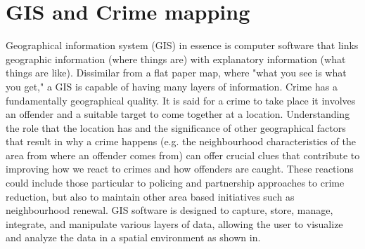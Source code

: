 \section{GIS and Crime mapping}
Geographical information system (GIS) in essence is computer software that links geographic information (where things are) with explanatory information (what things are like). Dissimilar from a flat paper map, where "what you see is what you get," a GIS is capable of having many layers of information.
Crime has a fundamentally geographical quality. It is said for a crime to take place it involves an offender and a suitable target to come together at a location. Understanding the role that the location has and the significance of other geographical factors that result in why a crime happens (e.g. the neighbourhood characteristics of the area from where an offender comes from) can offer crucial clues that contribute to improving how we react to crimes and how offenders are caught. These reactions could include those particular to policing and partnership approaches to crime reduction, but also to maintain other area based initiatives such as neighbourhood renewal.
GIS software is designed to capture, store, manage, integrate, and manipulate various layers of data, allowing the user to visualize and analyze the data in a spatial environment as shown in. 





